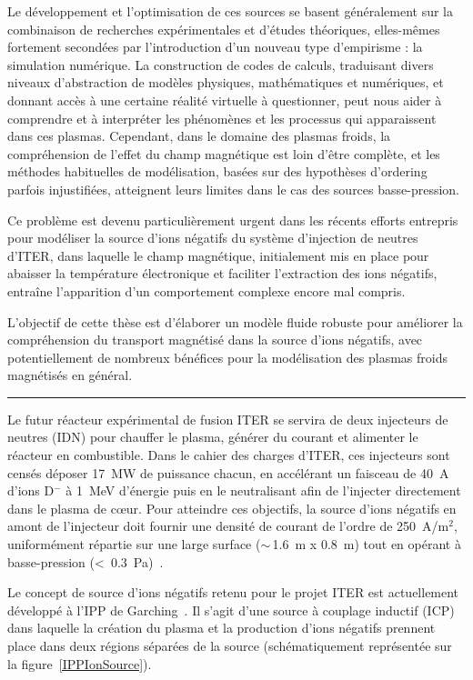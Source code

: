 \begin{refsection}
Le développement et l'optimisation de ces sources se basent généralement sur la
combinaison de recherches expérimentales et d'études théoriques, elles-mêmes
fortement secondées par l'introduction d'un nouveau type d'empirisme : la
simulation numérique.
La construction de codes de calculs, traduisant divers niveaux d'abstraction de
modèles physiques, mathématiques et numériques, et donnant accès à une
certaine réalité virtuelle à questionner, peut nous aider à
comprendre et à interpréter les phénomènes et les processus qui apparaissent dans ces
plasmas. Cependant, dans le domaine des plasmas froids, la compréhension de
l'effet du champ magnétique est loin d'être complète, et les méthodes
habituelles de modélisation, basées sur des hypothèses d'ordering parfois
injustifiées, atteignent leurs limites dans le cas des sources basse-pression. 

Ce
problème est devenu particulièrement urgent dans les récents efforts entrepris pour modéliser
la source d'ions négatifs du système d'injection de neutres d'ITER, dans
laquelle le champ magnétique, initialement mis en place pour abaisser la
température électronique et faciliter l'extraction des ions négatifs, entraîne
l'apparition d'un comportement complexe encore mal compris.

L'objectif de cette thèse est d'élaborer un modèle fluide robuste pour 
améliorer la compréhension du transport magnétisé dans 
la source d'ions négatifs, avec potentiellement de nombreux bénéfices pour
la modélisation des plasmas froids magnétisés en général.

\begin{center}
\rule{0.6\textwidth}{1pt}
\end{center}

Le futur réacteur expérimental de fusion ITER se servira de deux injecteurs de
neutres (IDN) pour chauffer le plasma, générer du courant et alimenter le
réacteur en combustible. Dans le cahier des charges d'ITER, ces injecteurs
sont censés déposer 17~MW de puissance chacun, en accélérant un
faisceau de 40~A d'ions D$^-$ à 1~MeV d'énergie puis en le neutralisant afin de
l'injecter directement dans le plasma de c\oe ur. 
Pour atteindre ces objectifs,
la source d'ions négatifs en amont de l'injecteur doit fournir
une densité de courant de l'ordre de 250~A/m$^2$, uniformément répartie sur une
large surface ($\sim\,$1.6~m x 0.8~m) tout en opérant à
basse-pression (<~0.3~Pa)~\parencite{SimoninHDR}. 

Le concept de source d'ions négatifs retenu pour le projet ITER est
actuellement développé à l'IPP de Garching~\parencite{Hemsworth}. Il s'agit
d'une source à couplage inductif (ICP) dans laquelle la création du plasma et la
production d'ions négatifs prennent place dans deux régions séparées de la
source (schématiquement représentée sur la
figure~\ref{IPPIonSource}).


\end{refsection}
